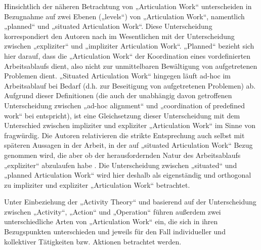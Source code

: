 Hinsichtlich der näheren Betrachtung von „Articulation Work“ unterscheiden \citet{Fjuk97} in Bezugnahme auf \citet{Strauss93} zwei Ebenen („levels“) von „Articulation Work“, namentlich „planned“ und „situated Articulation Work“. Diese Unterscheidung korrespondiert den Autoren nach im Wesentlichen mit der Unterscheidung zwischen „expliziter“ und „impliziter Articulation Work“. „Planned“ bezieht sich hier darauf, dass die „Articulation Work“ der Koordination eines vordefinierten Arbeitsablaufs dient, also nicht zur unmittelbaren Bewältigung von aufgetretenen Problemen dient. „Situated Articulation Work“ hingegen läuft ad-hoc im Arbeitsablauf bei Bedarf (d.h. zur Beseitigung von aufgetretenen Problemen) ab. Aufgrund dieser Definitionen (die auch der unabhängig davon getroffenen Unterscheidung zwischen „ad-hoc alignment“ und „coordination of predefined work“ bei \citet{Schmidt00} entspricht), ist eine Gleichsetzung dieser Unterscheidung mit dem Unterschied zwischen impliziter und expliziter „Articulation Work“ im Sinne von \citet{Strauss93} fragwürdig. Die Autoren relativieren die strikte Entsprechung auch selbst mit späteren Aussagen in der Arbeit, in der auf „situated Articulation Work“ Bezug genommen wird, die aber ob der herausfordernden Natur des Arbeitsablaufs „expliziter“ abzulaufen habe \citep[][S. 15]{Fjuk97}. Die Unterscheidung zwischen „situated“ und „planned Articulation Work“ wird hier deshalb als eigenständig und orthogonal zu impliziter und expliziter „Articulation Work“ betrachtet.

Unter Einbeziehung der „Activity Theory“ und basierend auf der Unterscheidung zwischen „Activity“, „Action“ und „Operation“ führen \citet{Fjuk97} außerdem zwei unterschiedliche Arten von „Articulation Work“ ein, die sich in ihren Bezugspunkten unterschieden und jeweils für den Fall individueller und kollektiver Tätigkeiten bzw. Aktionen betrachtet werden.  

